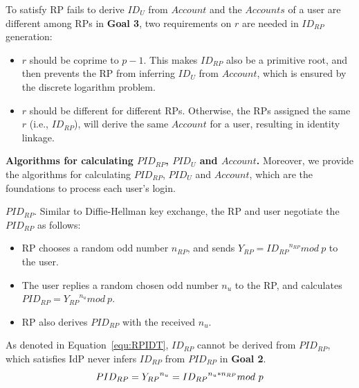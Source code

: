 To satisfy RP fails to derive $ID_U$ from $Account$ and the $Accounts$ of a user are different among RPs in \textbf{Goal 3}, two requirements on $r$ are needed  in $ID_{RP}$ generation:
\begin{itemize}
  \item $r$ should be coprime to $p-1$. This makes $ID_{RP}$ also be  a primitive root, and then prevents the RP from inferring $ID_U$ from $Account$, which is  ensured by the discrete logarithm problem.

  \item  $r$ should be different for different RPs. Otherwise, the RPs assigned the same $r$ (i.e., $ID_{RP}$), will derive the same $Account$ for a user, resulting in identity linkage. %
\end{itemize}





\vspace{1mm}\noindent\textbf{Algorithms for calculating  $PID_{RP}$, $PID_U$ and $Account$.} Moreover, we provide the algorithms for calculating  $PID_{RP}$, $PID_U$ and $Account$,
which are the foundations to process each user's login. %

\noindent\textbf{$PID_{RP}$}. Similar to Diffie-Hellman key exchange\cite{DiffieH76}, the RP and user negotiate the  $PID_{RP}$ as follows:
\begin{itemize}
  \item RP chooses a random odd number $n_{RP}$, and sends $Y_{RP} = {ID_{RP}}^{n_{RP}} mod \ p$ to the user.
  \item The user replies a random chosen odd number $n_{u}$ to the RP, and calculates $PID_{RP} = {Y_{RP}}^{n_{u}} mod \ p$.
  \item RP also derives $PID_{RP}$ with the received $n_{u}$.
\end{itemize}

As denoted in Equation~\ref{equ:RPIDT}, ${ID_{RP}}$ cannot be derived from $PID_{RP}$, which satisfies IdP never infers ${ID_{RP}}$ from $PID_{RP}$ in \textbf{Goal 2}.
   \begin{equation}
   PID_{RP} = {Y_{RP}}^{n_{u}} = {ID_{RP}}^{n_{u}* n_{RP}} mod \ p
   \label{equ:ID_{RP}T}
   \end{equation}

